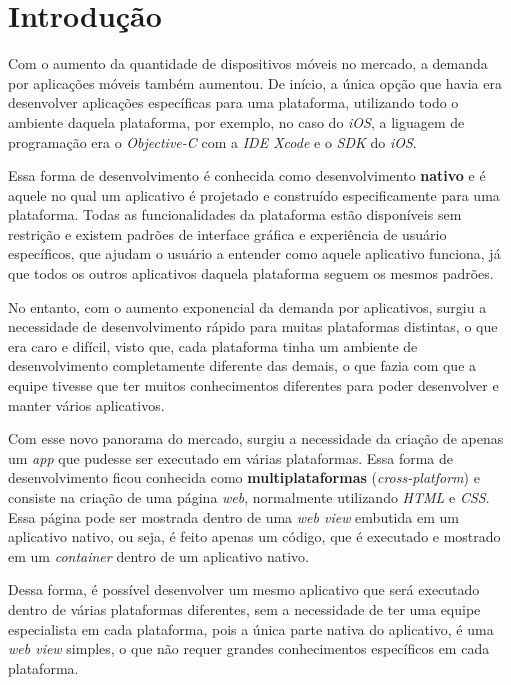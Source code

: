 \chapter{Introdução} \label{cap:introducao}

Com o aumento da quantidade de dispositivos móveis no mercado, a demanda por aplicações móveis também aumentou.
De início, a única opção que havia era desenvolver aplicações específicas para uma plataforma, utilizando todo o ambiente daquela plataforma, por exemplo,
no caso do \textit{iOS}, a liguagem de programação era o \textit{Objective-C} com a \textit{IDE Xcode} e o \textit{SDK} do \textit{iOS}.

Essa forma de desenvolvimento é conhecida como desenvolvimento \textbf{nativo} e é aquele no qual um aplicativo é projetado e construído especificamente para uma plataforma. 
Todas as funcionalidades da plataforma estão disponíveis sem restrição e existem padrões de interface gráfica e experiência de usuário específicos, que ajudam o usuário a 
entender como aquele aplicativo funciona, já que todos os outros aplicativos daquela plataforma seguem os mesmos padrões. 

No entanto, com o aumento exponencial da demanda por aplicativos, surgiu a necessidade de desenvolvimento rápido para muitas plataformas distintas, o que era caro e difícil,
visto que, cada plataforma tinha um ambiente de desenvolvimento completamente diferente das demais, o que fazia com que a equipe tivesse que ter muitos conhecimentos diferentes
para poder desenvolver e manter vários aplicativos.  

Com esse novo panorama do mercado, surgiu a necessidade da criação de apenas um \textit{app} que pudesse ser executado em várias plataformas. Essa forma de desenvolvimento ficou conhecida como 
\textbf{multiplataformas} (\textit{cross-platform}) e consiste na criação de uma página \textit{web}, 
normalmente utilizando \textit{HTML} e \textit{CSS}. Essa página pode ser mostrada dentro de uma \textit{web view}%
embutida em um aplicativo nativo, ou seja, é feito apenas um código, que é executado e mostrado em um \textit{container} dentro de um aplicativo nativo. 

Dessa forma, é possível desenvolver um mesmo aplicativo que será executado dentro de várias plataformas diferentes, sem a necessidade de ter uma equipe especialista em cada plataforma, pois a única 
parte nativa do aplicativo, é uma \textit{web view} simples, o que não requer grandes conhecimentos específicos em cada plataforma.

